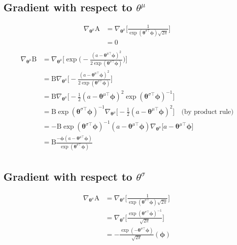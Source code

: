 \documentclass{article}
\begin{document}
\subsection{Gradient with respect to $\theta^\mu$}
\begin{align*}
\nabla_{\bm{\theta}^\mu} \text{A} &= \nabla_{\bm{\theta}^\mu} \bigg[\frac{1}{\exp(\bm{\theta}^
	{\sigma\top}\bm{\phi})\sqrt{2\pi}}\bigg]\\
&=  0\\
\end{align*}
\begin{align*}
\nabla_{\bm{\theta}^\mu} \text{B} &= \nabla_{\bm{\theta}^\mu} \bigg[ \exp\bigg(- \frac{(a - \bm{\theta}^{\mu\top}\bm{\phi})^2}{2\exp(\bm{\theta}^{\sigma\top}\bm{\phi})}\bigg)\bigg]\\
&= \text{B} \nabla_{\bm{\theta}^\mu} \bigg[- \frac{(a - \bm{\theta}^{\mu\top}\bm{\phi})^2}{2\exp(\bm{\theta}^{\sigma\top}\bm{\phi})}\bigg]\\
&= \text{B} \nabla_{\bm{\theta}^\mu} \bigg[-\frac{1}{2} (a - \bm{\theta}^{\mu\top}\bm{\phi})^2\exp(\bm{\theta}^{\sigma\top}\bm{\phi})^{-1}\bigg]\\
&= \text{B} \exp(\bm{\theta}^{\sigma\top}\bm{\phi})^{-1} \nabla_{\bm{\theta}^\mu} \bigg[-\frac{1}{2} (a - \bm{\theta}^{\mu\top}\bm{\phi})^2\bigg]\quad\text{(by product rule)}\\
&= {-\text{B}} \exp(\bm{\theta}^{\sigma\top}\bm{\phi})^{-1} (a - \bm{\theta}^{\mu\top}\bm{\phi})\nabla_{\bm{\theta}^\mu} \bigg[a - \bm{\theta}^{\mu\top}\bm{\phi}\bigg]\\
&= \text{B}\frac{{-\bm{\phi}}(a - \bm{\theta}^{\mu\top}\bm{\phi}) }{\exp(\bm{\theta}^{\sigma\top}\bm{\phi})}\\
\end{align*}
\clearpage
\subsection{Gradient with respect to $\theta^\sigma$}
\begin{align*}
	\nabla_{\bm{\theta}^\sigma} \text{A} &= \nabla_{\bm{\theta}^\sigma} \bigg[\frac{1}{\exp(\bm{\theta}^
		{\sigma\top}\bm{\phi})\sqrt{2\pi}}\bigg]\\
&= \nabla_{\bm{\theta}^\sigma} \bigg[\frac{\exp(\bm{\theta}^{\sigma\top}\bm{\phi})^{-1}}{\sqrt{2\pi}}\bigg]\\
&=  -\frac{\exp(-\bm{\theta}^
	{\sigma\top}\bm{\phi})}{\sqrt{2\pi}} (\bm{\phi})\\
\end{align*}
\end{document}
